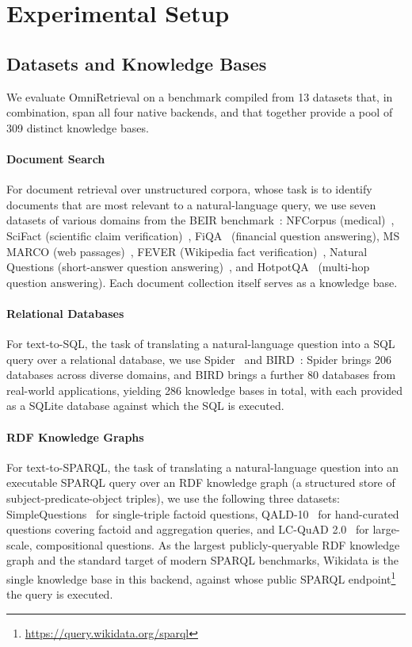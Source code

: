 \section{Experimental Setup}

\subsection{Datasets and Knowledge Bases}

We evaluate OmniRetrieval on a benchmark compiled from 13 datasets that, in combination, span all four native backends, and that together provide a pool of 309 distinct knowledge bases.

\vspace{-0.075in}
\paragraph{Document Search}
For document retrieval over unstructured corpora, whose task is to identify documents that are most relevant to a natural-language query, we use seven datasets of various domains from the BEIR benchmark~\citep{BEIR}: NFCorpus (medical)~\citep{NFCorpus}, SciFact (scientific claim verification)~\citep{SciFact}, FiQA~\citep{FiQA} (financial question answering), MS MARCO (web passages)~\citep{MSMARCO}, FEVER (Wikipedia fact verification)~\citep{FEVER}, Natural Questions (short-answer question answering)~\citep{NQ}, and HotpotQA~\citep{HotpotQA} (multi-hop question answering). Each document collection itself serves as a knowledge base.

\vspace{-0.075in}
\paragraph{Relational Databases}
For text-to-SQL, the task of translating a natural-language question into a SQL query over a relational database, we use Spider~\citep{Spider} and BIRD~\citep{Bird}: Spider brings 206 databases across diverse domains, and BIRD brings a further 80 databases from real-world applications, yielding 286 knowledge bases in total, with each provided as a SQLite database against which the SQL is executed.

\vspace{-0.075in}
\paragraph{RDF Knowledge Graphs}
For text-to-SPARQL, the task of translating a natural-language question into an executable SPARQL query over an RDF knowledge graph (a structured store of subject-predicate-object triples), we use the following three datasets: SimpleQuestions~\citep{SimpleQuestions} for single-triple factoid questions, QALD-10~\citep{QALD10} for hand-curated questions covering factoid and aggregation queries, and LC-QuAD 2.0~\citep{LCQuAD2} for large-scale, compositional questions. As the largest publicly-queryable RDF knowledge graph and the standard target of modern SPARQL benchmarks, Wikidata is the single knowledge base in this backend, against whose public SPARQL endpoint\footnote{\url{https://query.wikidata.org/sparql}} the query is executed.


